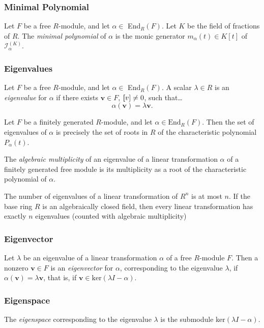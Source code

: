\subsubsection{Minimal Polynomial}\label{minimalpoynomial}
Let $F$ be a free $R$-module, and let $\alpha \in$ End$_R(F)$. Let $K$ be the field of fractions of $R$. The
\emph{minimal polynomial} of $\alpha$ is the monic generator $m_{\alpha}(t) \in K[t]$ of $\mathcal{I}_{\alpha}^{(K)}$.

\subsubsection{Eigenvalues}\label{eigenvalue}
Let $F$ be a free $R$-module, and let $\alpha \in$ End$_R(F)$. A scalar $\lambda \in R$ is an \emph{eigenvalue} for $\alpha$
if there exists $\textbf{v} \in F$, $\textbf[v] \neq 0$, such that\dots
$$\alpha(\textbf{v}) = \lambda \textbf{v}.$$

\begin{lemma}
Let $F$ be a finitely generated $R$-module, and let $\alpha \in \textrm{End}_R(F)$. Then the set of eigenvalues of $\alpha$
is precisely the set of roots in $R$ of the characteristic polynomial $P_{\alpha}(t)$.
\end{lemma}

The \emph{algebraic multiplicity} of an eigenvalue of a linear transformation $\alpha$ of a finitely generated
free module is its multiplicity as a root of the characteristic polynomial of $\alpha$.

\begin{corollary}
The number of eigenvalues of a linear transformation of $R^n$ is at most $n$. If the base ring $R$ is an algebraically closed
field, then every linear transformation has exactly $n$ eigenvalues (counted with algebraic multiplicity)
\end{corollary}

\subsubsection{Eigenvector}\label{eigenvector}
Let $\lambda$ be an eigenvalue of a linear transformation $\alpha$ of a free $R$-module $F$. Then a nonzero $\textbf{v} \in F$
is an \emph{eigenvector} for $\alpha$, corresponding to the eigenvalue $\lambda$, if $\alpha(\textbf{v}) = \lambda \textbf{v}$,
that is, if $\textbf{v} \in \textrm{ker}(\lambda I - \alpha)$.

\subsubsection{Eigenspace}\label{eigenspace}
The \emph{eigenspace} corresponding to the eigenvalue $\lambda$ is the submodule ker$(\lambda I - \alpha)$.

